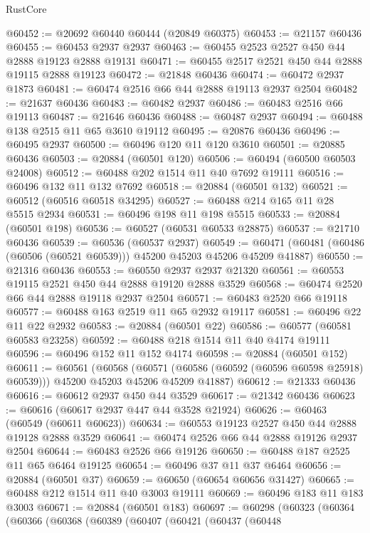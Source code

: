 \begin{lexlean}{RustCore}
\begin{coremodule}
@60452 := @20692 @60440 @60444 (@20849 @60375)
@60453 := @21157 @60436
@60455 := @60453 @2937 @2937
@60463 := @60455 @2523 @2527 @450 @44 @2888 @19123 @2888 @19131
@60471 := @60455 @2517 @2521 @450 @44 @2888 @19115 @2888 @19123
@60472 := @21848 @60436
@60474 := @60472 @2937 @1873
@60481 := @60474 @2516 @66 @44 @2888 @19113 @2937 @2504
@60482 := @21637 @60436
@60483 := @60482 @2937
@60486 := @60483 @2516 @66 @19113
@60487 := @21646 @60436
@60488 := @60487 @2937
@60494 := @60488 @138 @2515 @11 @65 @3610 @19112
@60495 := @20876 @60436
@60496 := @60495 @2937
@60500 := @60496 @120 @11 @120 @3610
@60501 := @20885 @60436
@60503 := @20884 (@60501 @120)
@60506 := @60494 (@60500 @60503 @24008)
@60512 := @60488 @202 @1514 @11 @40 @7692 @19111
@60516 := @60496 @132 @11 @132 @7692
@60518 := @20884 (@60501 @132)
@60521 := @60512 (@60516 @60518 @34295)
@60527 := @60488 @214 @165 @11 @28 @5515 @2934
@60531 := @60496 @198 @11 @198 @5515
@60533 := @20884 (@60501 @198)
@60536 := @60527 (@60531 @60533 @28875)
@60537 := @21710 @60436
@60539 := @60536 (@60537 @2937)
@60549 := @60471 (@60481 (@60486 (@60506 (@60521 @60539))) @45200 @45203 @45206 @45209 @41887)
@60550 := @21316 @60436
@60553 := @60550 @2937 @2937 @21320
@60561 := @60553 @19115 @2521 @450 @44 @2888 @19120 @2888 @3529
@60568 := @60474 @2520 @66 @44 @2888 @19118 @2937 @2504
@60571 := @60483 @2520 @66 @19118
@60577 := @60488 @163 @2519 @11 @65 @2932 @19117
@60581 := @60496 @22 @11 @22 @2932
@60583 := @20884 (@60501 @22)
@60586 := @60577 (@60581 @60583 @23258)
@60592 := @60488 @218 @1514 @11 @40 @4174 @19111
@60596 := @60496 @152 @11 @152 @4174
@60598 := @20884 (@60501 @152)
@60611 := @60561
    (@60568
      (@60571 (@60586 (@60592 (@60596 @60598 @25918) @60539)))
      @45200
      @45203
      @45206
      @45209
      @41887)
@60612 := @21333 @60436
@60616 := @60612 @2937 @450 @44 @3529
@60617 := @21342 @60436
@60623 := @60616 (@60617 @2937 @447 @44 @3528 @21924)
@60626 := @60463 (@60549 (@60611 @60623))
@60634 := @60553 @19123 @2527 @450 @44 @2888 @19128 @2888 @3529
@60641 := @60474 @2526 @66 @44 @2888 @19126 @2937 @2504
@60644 := @60483 @2526 @66 @19126
@60650 := @60488 @187 @2525 @11 @65 @6464 @19125
@60654 := @60496 @37 @11 @37 @6464
@60656 := @20884 (@60501 @37)
@60659 := @60650 (@60654 @60656 @31427)
@60665 := @60488 @212 @1514 @11 @40 @3003 @19111
@60669 := @60496 @183 @11 @183 @3003
@60671 := @20884 (@60501 @183)
@60697 := @60298
    (@60323
      (@60364
        (@60366
          (@60368
            (@60389
              (@60407
                (@60421
                  (@60437
                    (@60448

\end{coremodule}
\end{lexlean}
